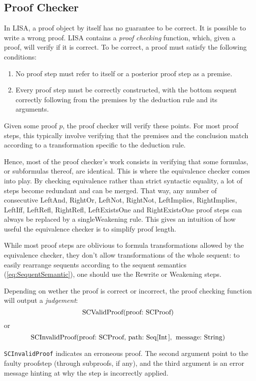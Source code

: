 \subsection{Proof Checker}
\label{subsec:proofchecker}

In LISA, a proof object by itself has no guarantee to be correct. It is possible to write a wrong proof. LISA contains a \textit{proof checking} function, which, given a proof, will verify if it is correct. To be correct, a proof must satisfy the following conditions:
\begin{enumerate}
  \item No proof step must refer to itself or a posterior proof step as a premise.
  \item Every proof step must be correctly constructed, with the bottom sequent correctly following from the premises by the deduction rule and its arguments.
\end{enumerate}


Given some proof $p$, the proof checker will verify these points. For most proof steps, this typically involve verifying that the premises and the conclusion match according to a transformation specific to the deduction rule. 

Hence, most of the proof checker's work consists in verifying that some formulas, or subformulas thereof, are identical. This is where the equivalence checker comes into play. By checking equivalence rather than strict syntactic equality, a lot of steps become redundant and can be merged. That way,  any number of consecutive {LeftAnd}, {RightOr}, {LeftNot}, {RightNot}, {LeftImplies}, {RightImplies}, {LeftIff}, {LeftRefl}, {RightRefl}, {LeftExistsOne} and  {RightExistsOne} proof steps can always be replaced by a single{Weakening} rule. This gives an intuition of how useful the equivalence checker is to simplify proof length.

While most proof steps are oblivious to formula transformations allowed by the equivalence checker, they don't allow transformations of the whole sequent: to easily rearrange sequents according to the sequent semantics (\ref{eq:SequentSemantic}), one should use the Rewrite or Weakening steps.

Depending on wether the proof is correct or incorrect, the proof checking function will output a \textit{judgement}:
$$
  \text{\lstinline{SCValidProof(proof: SCProof)}}
$$
or
$$
  \text{\lstinline{SCInvalidProof(proof: SCProof, path: Seq[Int], message: String)}}
$$

\lstinline{SCInvalidProof}{} indicates an erroneous proof. The second argument point to the faulty proofstep (through subproofs, if any), and the third argument is an error message hinting at why the step is incorrectly applied.


